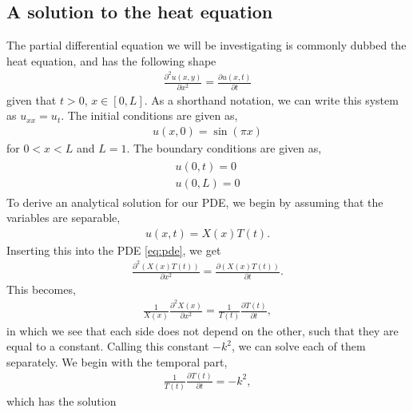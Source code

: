 
\subsection{A solution to the heat equation}
The partial differential equation we will be investigating is commonly dubbed the heat equation, and has the following shape
\begin{align}
    \frac{\partial^2 u(x,y)}{\partial x^2} = \frac{\partial u(x,t)}{\partial t}
    \label{eq:pde}
\end{align}
given that $t>0$, $x\in [0,L]$. As a shorthand notation, we can write this system as $u_{xx} = u_{t}$. The initial conditions are given as,
\begin{align}
    u(x,0) = \sin(\pi x)
    \label{eq:initial-conds}
\end{align}
for $0 < x < L$ and $L = 1$. The boundary conditions are given as,
\begin{align}
    \begin{split}
        u(0,t) = 0 \\
        u(0,L) = 0
    \end{split}
    \label{eq:boundary-conditions}
\end{align}
To derive an analytical solution for our PDE, we begin by assuming that the variables are separable,
\begin{align*}
    u(x,t) = X(x)T(t).
\end{align*}
Inserting this into the PDE \eqref{eq:pde}, we get
\begin{align*}
    \frac{\partial^2 \left(X(x)T(t)\right)}{\partial x^2} = \frac{\partial \left(X(x)T(t)\right)}{\partial t}.
\end{align*}
This becomes,
\begin{align*}
    \frac{1}{X(x)}\frac{\partial^2 X(x)}{\partial x^2} = \frac{1}{T(t)}\frac{\partial T(t)}{\partial t},
\end{align*}
in which we see that each side does not depend on the other, such that they are equal to a constant. Calling this constant $-k^2$, we can solve each of them separately. We begin with the temporal part,
\begin{align*}
    \frac{1}{T(t)}\frac{\partial T(t)}{\partial t} = -k^2,
\end{align*}
which has the solution

